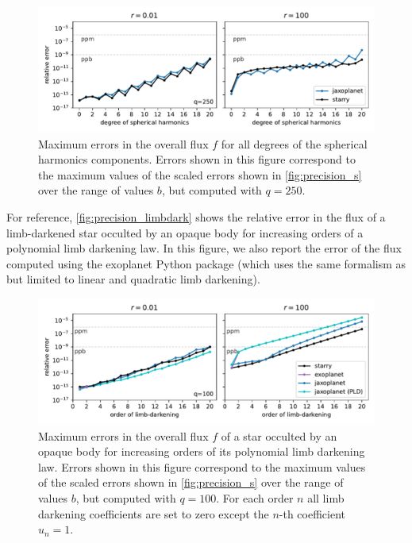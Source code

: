 \documentclass[modern]{aastex631}
\begin{document}
\begin{figure}[H]
    \begin{center}
        \includegraphics[width=\textwidth]{../workflows/precision/figures/error_degree.pdf}
        \caption{Maximum errors in the overall flux $f$ for all degrees of the spherical harmonics components. Errors shown in this figure correspond to the maximum values of the scaled errors shown in \autoref{fig:precision_s} over the range of values $b$, but computed with $q=250$. }
        \label{fig:precision_degree}
    \end{center}
\end{figure}
For reference, \autoref{fig:precision_limbdark} shows the relative error in the flux of a limb-darkened star occulted by an opaque body for increasing orders of a polynomial limb darkening law. In this figure, we also report the error of the flux computed using the \textsf{exoplanet} Python package (which uses the same formalism as \cite{Agol2020} but limited to linear and quadratic limb darkening).
\begin{figure}[H]
    \begin{center}
        \includegraphics[width=\textwidth]{../workflows/precision/figures/limbdark_error.PDF}
        \caption{Maximum errors in the overall flux $f$ of a star occulted by an opaque body for increasing orders of its polynomial limb darkening law. Errors shown in this figure correspond to the maximum values of the scaled errors shown in \autoref{fig:precision_s} over the range of values $b$, but computed with $q=100$. For each order $n$ all limb darkening coefficients are set to zero except the $n$-th coefficient $u_n=1$. }
        \label{fig:precision_limbdark}
    \end{center}
\end{figure}
\end{document}
